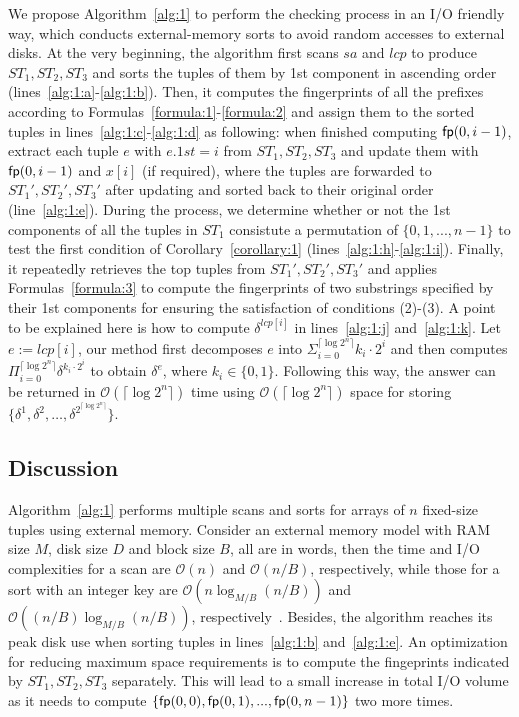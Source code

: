 \documentclass[10pt,journal,compsoc]{IEEEtran}
\begin{document}
We propose Algorithm~\ref{alg:1} to perform the checking process in an I/O friendly way, which conducts external-memory sorts to avoid random accesses to external disks. 
At the very beginning, the algorithm first scans $sa$ and $lcp$ to produce $ST_1, ST_2, ST_3$ and sorts the tuples of them by 1st component in ascending order (lines~\ref{alg:1:a}-\ref{alg:1:b}). 
Then, it computes the fingerprints of all the prefixes according to Formulas~\ref{formula:1}-\ref{formula:2} and assign them to the sorted tuples in lines~\ref{alg:1:c}-\ref{alg:1:d} as following: when finished computing ${\sf fp}(0, i - 1)$, extract each tuple $e$ with $e.1st = i$ from $ST_1, ST_2, ST_3$  and update them with ${\sf fp}(0, i - 1)$ and $x[i]$ (if required), where the tuples are forwarded to $ST_1', ST_2', ST_3'$ after updating and sorted back to their original order (line~\ref{alg:1:e}). 
During the process, we determine whether or not the 1st components of all the tuples in $ST_1$ consistute a permutation of $\{0, 1, ..., n - 1\}$ to test the first condition of Corollary~\ref{corollary:1} (lines~\ref{alg:1:h}-\ref{alg:1:i}). 
Finally, it repeatedly retrieves the top tuples from $ST_1', ST_2', ST_3'$ and applies Formulas~\ref{formula:3} to compute the fingerprints of two substrings specified by their 1st components for ensuring the satisfaction of conditions (2)-(3). A point to be explained here is how to compute $\delta^{lcp[i]}$ in lines~\ref{alg:1:j} and~\ref{alg:1:k}. Let $e := lcp[i]$, our method first decomposes $e$ into $\Sigma_{i = 0}^{\lceil \log2^n \rceil}{k_i \cdot 2^i}$ and then computes $\Pi_{i = 0}^{\lceil \log2^n \rceil}{\delta}^{k_i \cdot 2^i}$ to obtain $\delta^{e}$, where $k_i \in \{0, 1\}$. Following this way, the answer can be returned in $\mathcal{O}(\lceil \log2^n \rceil)$ time using $\mathcal{O}(\lceil \log2^n \rceil)$ space for storing $\{{\delta}^{1}, {\delta}^{2}, \dots, {\delta}^{2^{\lceil \log2^n \rceil}} \}$. 

\subsection{Discussion} \label{sec:method1:discussion}

Algorithm~\ref{alg:1} performs multiple scans and sorts for arrays of $n$ fixed-size tuples using external memory. Consider an external memory model with RAM size $M$, disk size $D$ and block size $B$, all are in words, then the time and I/O complexities for a scan are $\mathcal{O}(n)$ and $\mathcal{O}(n / B)$, respectively, while those for a sort with an integer key are $\mathcal{O}(n\log_{M/ B}(n / B))$ and $\mathcal{O}((n / B)\log_{M / B}(n / B))$, respectively~\cite{Arge2013}. Besides, the algorithm reaches its peak disk use when sorting tuples in lines~\ref{alg:1:b} and~\ref{alg:1:e}. An optimization for reducing maximum space requirements is to compute the fingeprints indicated by $ST_1, ST_2, ST_3$ separately. This will lead to a small increase in total I/O volume as it needs to compute $\{{\sf fp}(0, 0), {\sf fp}(0, 1), ..., {\sf fp}(0, n - 1)\}$ two more times.
	
\end{document}
